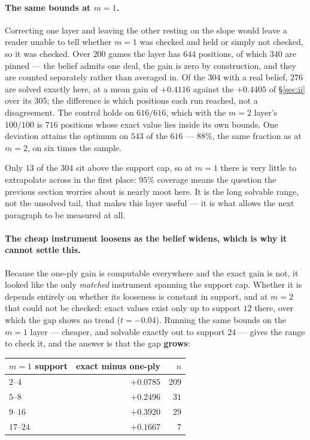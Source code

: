 \documentclass[11pt,letterpaper]{article}
\begin{document}
\paragraph{The same bounds at $m = 1$.} Correcting one layer and leaving the
other resting on the slope would leave a reader unable to tell whether $m = 1$
was checked and held or simply not checked, so it was checked. Over $200$
games the layer has $644$ positions, of which $340$ are pinned --- the belief
admits one deal, the gain is zero by construction, and they are counted
separately rather than averaged in. Of the $304$ with a real belief, $276$ are
solved exactly here, at a mean gain of $+0.4116$ against the $+0.4405$ of
\S\ref{sec:ii} over its $305$; the difference is which positions each run
reached, not a disagreement. The control holds on \textbf{$616/616$}, which
with the $m = 2$ layer's $100/100$ is $716$ positions whose exact value lies
inside its own bounds. One deviation attains the optimum on $543$ of the $616$
--- $88\%$, the same fraction as at $m = 2$, on six times the sample.

Only $13$ of the $304$ sit above the support cap, so at $m = 1$ there is very
little to extrapolate across in the first place: $95\%$ coverage means the
question the previous section worries about is nearly moot here. It is the
long solvable range, not the unsolved tail, that makes this layer useful --- it
is what allows the next paragraph to be measured at all.

\paragraph{The cheap instrument loosens as the belief widens, which is why it
cannot settle this.} Because the one-ply gain is computable everywhere and the
exact gain is not, it looked like the only \emph{matched} instrument spanning
the support cap. Whether it is depends entirely on whether its looseness is
constant in support, and at $m = 2$ that could not be checked: exact values
exist only up to support $12$ there, over which the gap shows no trend
($t = -0.04$). Running the same bounds on the $m = 1$ layer --- cheaper, and
solvable exactly out to support $24$ --- gives the range to check it, and the
answer is that the gap \textbf{grows}:

\begin{center}
\begin{tabular}{lrr}
\toprule
$m = 1$ support & exact minus one-ply & $n$ \\
\midrule
$2$--$4$   & $+0.0785$ & $209$ \\
$5$--$8$   & $+0.2496$ & $31$ \\
$9$--$16$  & $+0.3920$ & $29$ \\
$17$--$24$ & $+0.1667$ & $7$ \\
\bottomrule
\end{tabular}
\end{center}
\end{document}
